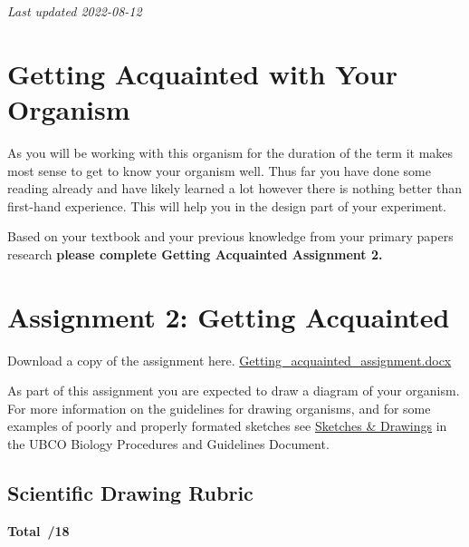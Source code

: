 \documentclass[
]{book}
\begin{document}
\emph{Last updated 2022-08-12}

\hypertarget{getting-acquainted-with-your-organism}{%
\chapter*{Getting Acquainted with Your Organism}\label{getting-acquainted-with-your-organism}}

As you will be working with this organism for the duration of the term it makes most sense to get to know your organism well. Thus far you have done some reading already and have likely learned a lot however there is nothing better than first-hand experience. This will help you in the design part of your experiment.

Based on your textbook and your previous knowledge from your primary papers research \textbf{please complete Getting Acquainted Assignment 2.}

\hypertarget{assignment-2-getting-acquainted}{%
\chapter*{Assignment 2: Getting Acquainted}\label{assignment-2-getting-acquainted}}

Download a copy of the assignment here. \href{files/getting_acquainted_assignment.docx}{Getting\_acquainted\_assignment.docx}

As part of this assignment you are expected to draw a diagram of your organism. For more information on the guidelines for drawing organisms, and for some examples of poorly and properly formated sketches see \href{https://ubco-biology.github.io/Procedures-and-Guidelines/sketches-drawings.html}{Sketches \& Drawings} in the UBCO Biology Procedures and Guidelines Document.

\hypertarget{scientific-drawing-rubric}{%
\section*{Scientific Drawing Rubric}\label{scientific-drawing-rubric}}

\textbf{Total~/18}
\end{document}
